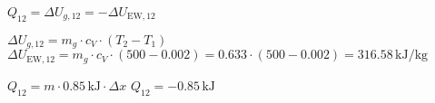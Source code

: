 \( Q_{12} = \Delta U_{g,12} = -\Delta U_{\text{EW},12} \)  

\( \Delta U_{g,12} = m_g \cdot c_V \cdot (T_2 - T_1) \)  
\( \Delta U_{\text{EW},12} = m_g \cdot c_V \cdot (500 - 0.002) = 0.633 \cdot (500 - 0.002) = 316.58 \, \text{kJ/kg} \)  

\( Q_{12} = m \cdot 0.85 \, \text{kJ} \cdot \Delta x \)  
\( Q_{12} = -0.85 \, \text{kJ} \)